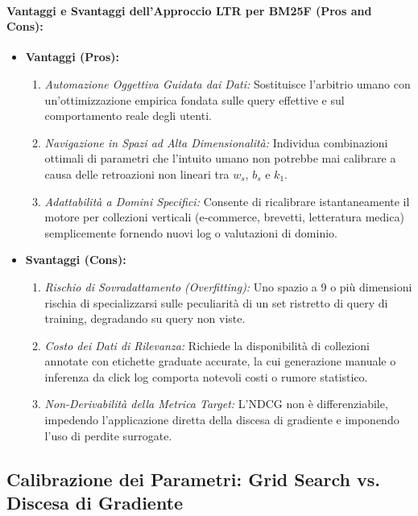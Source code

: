 \paragraph{Vantaggi e Svantaggi dell'Approccio LTR per BM25F (Pros and Cons):}
\begin{itemize}
    \item \textbf{Vantaggi (Pros):}
    \begin{enumerate}
        \item \textit{Automazione Oggettiva Guidata dai Dati:} Sostituisce l'arbitrio umano con un'ottimizzazione empirica fondata sulle query effettive e sul comportamento reale degli utenti.
        \item \textit{Navigazione in Spazi ad Alta Dimensionalit\`a:} Individua combinazioni ottimali di parametri che l'intuito umano non potrebbe mai calibrare a causa delle retroazioni non lineari tra $w_s$, $b_s$ e $k_1$.
        \item \textit{Adattabilit\`a a Domini Specifici:} Consente di ricalibrare istantaneamente il motore per collezioni verticali (e-commerce, brevetti, letteratura medica) semplicemente fornendo nuovi log o valutazioni di dominio.
    \end{enumerate}
    \item \textbf{Svantaggi (Cons):}
    \begin{enumerate}
        \item \textit{Rischio di Sovradattamento (Overfitting):} Uno spazio a 9 o pi\`u dimensioni rischia di specializzarsi sulle peculiarit\`a di un set ristretto di query di training, degradando su query non viste.
        \item \textit{Costo dei Dati di Rilevanza:} Richiede la disponibilit\`a di collezioni annotate con etichette graduate accurate, la cui generazione manuale o inferenza da click log comporta notevoli costi o rumore statistico.
        \item \textit{Non-Derivabilit\`a della Metrica Target:} L'NDCG non \`e differenziabile, impedendo l'applicazione diretta della discesa di gradiente e imponendo l'uso di perdite surrogate.
    \end{enumerate}
\end{itemize}

\FloatBarrier
\subsection{Calibrazione dei Parametri: Grid Search vs. Discesa di Gradiente}
\label{subsec:grid-search-vs-gradient-descent}

